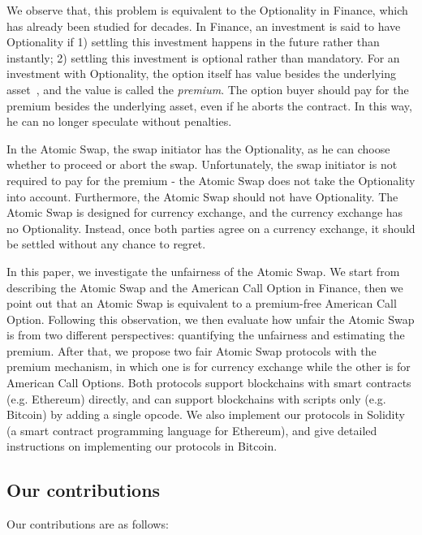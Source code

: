 We observe that, this problem is equivalent to the Optionality in Finance, which has already been studied for decades.
In Finance, an investment is said to have Optionality if
1) settling this investment happens in the future rather than instantly;
2) settling this investment is optional rather than mandatory.
For an investment with Optionality, the option itself has value besides the underlying asset~\cite{higham2004introduction}, and the value is called the \textit{premium}.
The option buyer should pay for the premium besides the underlying asset, even if he aborts the contract.
In this way, he can no longer speculate without penalties.

In the Atomic Swap, the swap initiator has the Optionality, as he can choose whether to proceed or abort the swap.
Unfortunately, the swap initiator is not required to pay for the premium - the Atomic Swap does not take the Optionality into account.
Furthermore, the Atomic Swap should not have Optionality.
The Atomic Swap is designed for currency exchange, and the currency exchange has no Optionality.
Instead, once both parties agree on a currency exchange, it should be settled without any chance to regret.

In this paper, we investigate the unfairness of the Atomic Swap.
We start from describing the Atomic Swap and the American Call Option in Finance,
then we point out that an Atomic Swap is equivalent to a premium-free American Call Option.
Following this observation, we then evaluate how unfair the Atomic Swap is from two different perspectives:
quantifying the unfairness and estimating the premium.
After that, we propose two fair Atomic Swap protocols with the premium mechanism, in which one is for currency exchange while the other is for American Call Options.
Both protocols support blockchains with smart contracts (e.g. Ethereum) directly, and can support blockchains with scripts only (e.g. Bitcoin) by adding a single opcode.
We also implement our protocols in Solidity (a smart contract programming language for Ethereum), and give detailed instructions on implementing our protocols in Bitcoin.

\subsection{Our contributions}

Our contributions are as follows:

